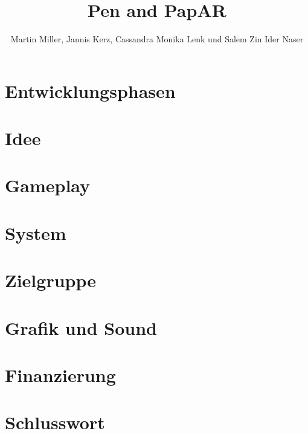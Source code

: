 \documentclass[11pt]{article}
\begin{document}
    \title{Pen and PapAR}
    \author{Martin Miller, Jannis Kerz, Cassandra Monika Lenk und Salem Zin Ider Naser}

    \maketitle
    \newpage

    \tableofcontents
    \newpage

    \section{Entwicklungsphasen}\label{sec:chapter_dev_process}
    

    \section{Idee}\label{sec:chapter_idea}
    

    \section{Gameplay}\label{sec:chapter_gameplay}
    

    \section{System}\label{sec:chapter_systems}
    

    \section{Zielgruppe}\label{sec:chapter_crowd}
    

    \section{Grafik und Sound}\label{sec:graphics/visuals}
    
    
    \section{Finanzierung}\label{sec:chapter_financials}
    

    \section{Schlusswort}\label{sec:chapter_finish}
\end{document}
